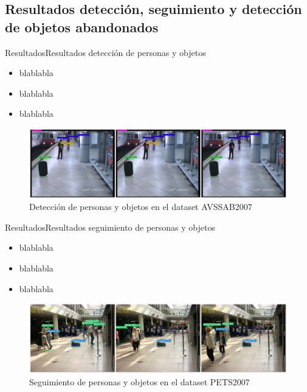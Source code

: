 
\subsection{Resultados detección, seguimiento y detección de objetos abandonados}

\begin{frame}{Resultados}{Resultados detección de personas y objetos}

\begin{itemize}
    \item blablabla
    \item blablabla
    \item blablabla
\end{itemize}

\begin{figure}[ht]
\centering
\includegraphics[width=1\textwidth]{Images/resultados/evaluacion-algoritmos/avss-easy-detection-example.jpg}
\caption{\label{fig:avss-easy-detection-example}Detección de personas y objetos en el dataset AVSSAB2007}
\end{figure}

\end{frame}


\begin{frame}{Resultados}{Resultados seguimiento de personas y objetos}

\begin{itemize}
    \item blablabla
    \item blablabla
    \item blablabla
\end{itemize}

\begin{figure}[ht]
\centering
\includegraphics[width=1\textwidth]{Images/resultados/evaluacion-algoritmos/pets-tracking-result-example.jpg}
\caption{\label{fig:pets-tracking-result-example}Seguimiento de personas y objetos en el dataset PETS2007}
\end{figure}

\end{frame}


